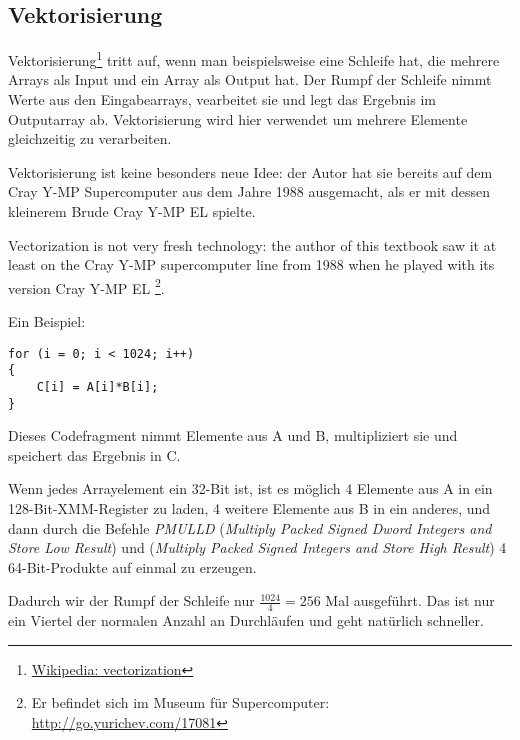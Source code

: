 \subsection{Vektorisierung}

\newcommand{\URLVEC}{\href{http://go.yurichev.com/17080}{Wikipedia: vectorization}}
Vektorisierung\footnote{\URLVEC} tritt auf, wenn man beispielsweise eine Schleife hat, die mehrere Arrays als Input und
ein Array als Output hat. Der Rumpf der Schleife nimmt Werte aus den Eingabearrays, vearbeitet sie und legt das Ergebnis
im Outputarray ab.
Vektorisierung wird hier verwendet um mehrere Elemente gleichzeitig zu verarbeiten.

Vektorisierung ist keine besonders neue Idee: der Autor hat sie bereits auf dem Cray Y-MP Supercomputer aus dem Jahre
1988 ausgemacht, als er mit dessen kleinerem Brude Cray Y-MP EL spielte.

Vectorization is not very fresh technology: the author of this textbook saw it at least on the Cray Y-MP 
supercomputer line from 1988 when he played with its  version Cray Y-MP EL
\footnote{Er befindet sich im Museum für Supercomputer: \url{http://go.yurichev.com/17081}}.

Ein Beispiel:

\begin{lstlisting}[style=customc]
for (i = 0; i < 1024; i++)
{
    C[i] = A[i]*B[i];
}
\end{lstlisting}

Dieses Codefragment nimmt Elemente aus A und B, multipliziert sie und speichert das Ergebnis in C.

\newcommand{\PMULLD}{\emph{PMULLD} (\emph{Multiply Packed Signed Dword Integers and Store Low Result})}
\newcommand{\PMULHW}{\TT{PMULHW} (\emph{Multiply Packed Signed Integers and Store High Result})}
Wenn jedes Arrayelement ein 32-Bit \Tint ist, ist es möglich 4 Elemente aus A in ein 128-Bit-XMM-Register zu laden, 4
weitere Elemente aus B in ein anderes, und dann durch die Befehle \PMULLD{} und \PMULHW{} 4 64-Bit-Produkte auf einmal
zu erzeugen.

Dadurch wir der Rumpf der Schleife nur $\frac{1024}{4}=256$ Mal ausgeführt. Das ist nur ein Viertel der normalen Anzahl
an Durchläufen und geht natürlich schneller.

\newcommand{\URLINTELVEC}{\href{http://go.yurichev.com/17082}{Auszug: Effektive automatische Vektorisierung}}

